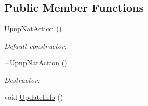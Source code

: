 \subsection*{Public Member Functions}
\begin{DoxyCompactItemize}
\item 
\hypertarget{class_upnp_nat_action_a22f1b9e48aafe506980c0a49454555a9}{
\hyperlink{class_upnp_nat_action_a22f1b9e48aafe506980c0a49454555a9}{UpnpNatAction} ()}
\label{class_upnp_nat_action_a22f1b9e48aafe506980c0a49454555a9}

\begin{DoxyCompactList}\small\item\em Default constructor. \item\end{DoxyCompactList}\item 
\hypertarget{class_upnp_nat_action_aac267c7e99e25214e2c50c9fdb0475db}{
\hyperlink{class_upnp_nat_action_aac267c7e99e25214e2c50c9fdb0475db}{$\sim$UpnpNatAction} ()}
\label{class_upnp_nat_action_aac267c7e99e25214e2c50c9fdb0475db}

\begin{DoxyCompactList}\small\item\em Destructor. \item\end{DoxyCompactList}\item 
\hypertarget{class_upnp_nat_action_a4f1cff158c738db157369ac9a5b735a0}{
void \hyperlink{class_upnp_nat_action_a4f1cff158c738db157369ac9a5b735a0}{UpdateInfo} ()}
\label{class_upnp_nat_action_a4f1cff158c738db157369ac9a5b735a0}


\end{DoxyCompactItemize}
